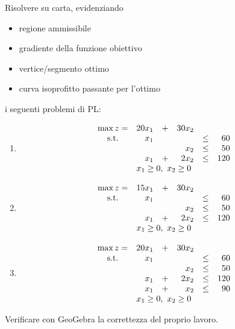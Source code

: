 \documentclass{beamer}
\begin{document}
\generatitolo

\begin{frame}{\esercizi}
Risolvere su carta, evidenziando 
\begin{itemize}
 \item regione ammissibile
 \item gradiente della funzione obiettivo
 \item vertice/segmento ottimo
 \item curva isoprofitto passante per l'ottimo
\end{itemize}
i seguenti problemi di PL:
\end{frame}

\begin{frame}[allowframebreaks]{\esercizi}
\begin{enumerate}
\item
\[\begin{array}{crrrcr}
\max z=& 20 x_1 &+& 30 x_2\\
{\rm s.t.} & x_1 & &       & \leq &  60 \\
           &     & &   x_2 & \leq &  50  \\
           & x_1 &+& 2 x_2 & \leq & 120  \\
           \multicolumn{6}{c}{x_1 \geq 0,\ x_2 \geq 0}
\end{array}%
\]%

\framebreak

\item
\[\begin{array}{crrrcr}
\max z=& 15 x_1 &+& 30 x_2\\
{\rm s.t.} & x_1 & &       & \leq &  60 \\
           &     & &   x_2 & \leq &  50  \\
           & x_1 &+& 2 x_2 & \leq & 120  \\
           \multicolumn{6}{c}{x_1 \geq 0,\ x_2 \geq 0}
\end{array}%
\]%


\item
\[\begin{array}{crrrcr}
\max z=& 20 x_1 &+& 30 x_2\\
{\rm s.t.} & x_1 & &       & \leq &  60 \\
           &     & &   x_2 & \leq &  50  \\
           & x_1 &+& 2 x_2 & \leq & 120  \\
           & x_1 &+&   x_2 & \leq &  90  \\
           \multicolumn{6}{c}{x_1 \geq 0,\ x_2 \geq 0}
\end{array}%
\]%
\end{enumerate}

\framebreak

Verificare con GeoGebra la correttezza del proprio lavoro.
\end{frame}
\end{document}
